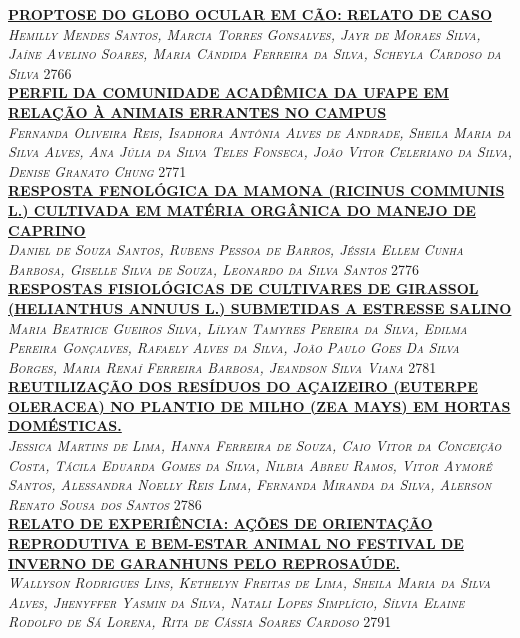 \noindent \textsc{\hyperlink{trabalhos/251520.pdf.1}{\textbf{PROPTOSE DO GLOBO OCULAR EM CÃO: RELATO DE CASO}}}\\ 
\noindent \textsc{\textit{Hemilly Mendes Santos, Marcia Torres Gonsalves, Jayr de Moraes Silva, Jaíne Avelino Soares, Maria Cândida Ferreira da Silva, Scheyla Cardoso da Silva}} \hfill 2766\\ 

\noindent \textsc{\hyperlink{trabalhos/251829.pdf.1}{\textbf{PERFIL DA COMUNIDADE ACADÊMICA DA UFAPE EM RELAÇÃO À ANIMAIS ERRANTES NO CAMPUS}}}\\ 
\noindent \textsc{\textit{Fernanda Oliveira Reis, Isadhora Antônia Alves de Andrade, Sheila Maria da Silva Alves, Ana Júlia da Silva Teles Fonseca, João Vitor Celeriano da Silva, Denise Granato Chung}} \hfill 2771\\ 

\noindent \textsc{\hyperlink{trabalhos/246104.pdf.1}{\textbf{RESPOSTA FENOLÓGICA DA MAMONA (RICINUS COMMUNIS L.) CULTIVADA EM MATÉRIA ORGÂNICA DO MANEJO DE CAPRINO}}}\\ 
\noindent \textsc{\textit{Daniel de Souza Santos, Rubens Pessoa de Barros, Jéssia Ellem Cunha Barbosa, Giselle Silva de Souza, Leonardo da Silva Santos}} \hfill 2776\\ 

\noindent \textsc{\hyperlink{trabalhos/251379.pdf.1}{\textbf{RESPOSTAS FISIOLÓGICAS DE CULTIVARES DE GIRASSOL (HELIANTHUS ANNUUS L.) SUBMETIDAS A ESTRESSE SALINO}}}\\ 
\noindent \textsc{\textit{Maria Beatrice Gueiros Silva, Lílyan Tamyres Pereira da Silva, Edilma Pereira Gonçalves, Rafaely Alves da Silva, João Paulo Goes Da Silva Borges, Maria Renaí Ferreira Barbosa, Jeandson Silva Viana}} \hfill 2781\\ 

\noindent \textsc{\hyperlink{trabalhos/251697.pdf.1}{\textbf{REUTILIZAÇÃO DOS RESÍDUOS DO AÇAIZEIRO (EUTERPE  OLERACEA) NO PLANTIO DE MILHO (ZEA MAYS) EM HORTAS DOMÉSTICAS. }}}\\ 
\noindent \textsc{\textit{Jessica Martins de Lima, Hanna Ferreira de Souza, Caio Vitor da Conceição Costa, Tácila Eduarda Gomes da Silva, Nilbia Abreu Ramos, Vitor Aymoré Santos, Alessandra Noelly Reis Lima, Fernanda Miranda da Silva, Alerson Renato Sousa dos Santos}} \hfill 2786\\ 

\noindent \textsc{\hyperlink{trabalhos/251552.pdf.1}{\textbf{RELATO DE EXPERIÊNCIA: AÇÕES DE ORIENTAÇÃO REPRODUTIVA E BEM-ESTAR ANIMAL NO FESTIVAL DE INVERNO DE GARANHUNS PELO REPROSAÚDE.}}}\\ 
\noindent \textsc{\textit{Wallyson Rodrigues Lins, Kethelyn Freitas de Lima, Sheila Maria da Silva Alves, Jhenyffer Yasmin da Silva, Natali Lopes Simplício, Sílvia Elaine Rodolfo de Sá Lorena, Rita de Cássia Soares Cardoso}} \hfill 2791\\ 

